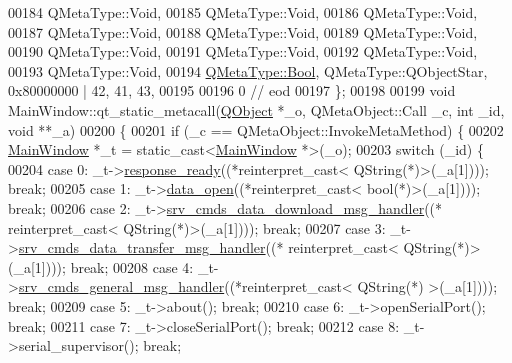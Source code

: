 \begin{DoxyCode}
00184     QMetaType::Void,
00185     QMetaType::Void,
00186     QMetaType::Void,
00187     QMetaType::Void,
00188     QMetaType::Void,
00189     QMetaType::Void,
00190     QMetaType::Void,
00191     QMetaType::Void,
00192     QMetaType::Void,
00193     QMetaType::Void,
00194     \hyperlink{a00004_a76a8b016e5ad61faf9062cc387df5016}{QMetaType::Bool}, QMetaType::QObjectStar, 0x80000000 | 42,   41,   43,
00195 
00196        0        \textcolor{comment}{// eod}
00197 \};
00198 
00199 \textcolor{keywordtype}{void} MainWindow::qt\_static\_metacall(\hyperlink{a00059}{QObject} *\_o, QMetaObject::Call \_c, \textcolor{keywordtype}{int} \_id, \textcolor{keywordtype}{void} **\_a)
00200 \{
00201     \textcolor{keywordflow}{if} (\_c == QMetaObject::InvokeMetaMethod) \{
00202         \hyperlink{a00017}{MainWindow} *\_t = \textcolor{keyword}{static\_cast<}\hyperlink{a00017}{MainWindow} *\textcolor{keyword}{>}(\_o);
00203         \textcolor{keywordflow}{switch} (\_id) \{
00204         \textcolor{keywordflow}{case} 0: \_t->\hyperlink{a00017_a3f6396874778799cf07a7a0149e54977}{response\_ready}((*\textcolor{keyword}{reinterpret\_cast<} QString(*)\textcolor{keyword}{>}(\_a[1]))); \textcolor{keywordflow}{break};
00205         \textcolor{keywordflow}{case} 1: \_t->\hyperlink{a00017_a35b895072769864ac42f8cd732267e4b}{data\_open}((*\textcolor{keyword}{reinterpret\_cast<} \textcolor{keywordtype}{bool}(*)\textcolor{keyword}{>}(\_a[1]))); \textcolor{keywordflow}{break};
00206         \textcolor{keywordflow}{case} 2: \_t->\hyperlink{a00017_ac84167866950dd1eb9a29a5293546c1a}{srv\_cmds\_data\_download\_msg\_handler}((*\textcolor{keyword}{
      reinterpret\_cast<} QString(*)\textcolor{keyword}{>}(\_a[1]))); \textcolor{keywordflow}{break};
00207         \textcolor{keywordflow}{case} 3: \_t->\hyperlink{a00017_ae19ec21c1009c81700a8ad2e1f81be07}{srv\_cmds\_data\_transfer\_msg\_handler}((*\textcolor{keyword}{
      reinterpret\_cast<} QString(*)\textcolor{keyword}{>}(\_a[1]))); \textcolor{keywordflow}{break};
00208         \textcolor{keywordflow}{case} 4: \_t->\hyperlink{a00017_a8a8cd34488e8ee213350afb5b2261677}{srv\_cmds\_general\_msg\_handler}((*\textcolor{keyword}{reinterpret\_cast<} QString(*)\textcolor{keyword}{
      >}(\_a[1]))); \textcolor{keywordflow}{break};
00209         \textcolor{keywordflow}{case} 5: \_t->about(); \textcolor{keywordflow}{break};
00210         \textcolor{keywordflow}{case} 6: \_t->openSerialPort(); \textcolor{keywordflow}{break};
00211         \textcolor{keywordflow}{case} 7: \_t->closeSerialPort(); \textcolor{keywordflow}{break};
00212         \textcolor{keywordflow}{case} 8: \_t->serial\_supervisor(); \textcolor{keywordflow}{break};

\end{DoxyCode}
